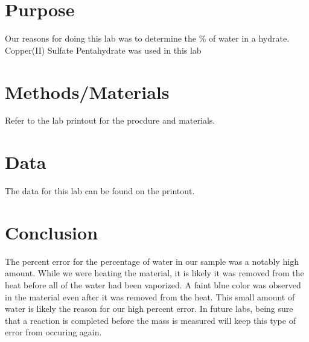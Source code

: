 \documentclass{article}
\begin{document}

\section{Purpose}
	Our reasons for doing this lab was to determine the \% of water in a hydrate. Copper(II) Sulfate Pentahydrate was used in this lab
\section{Methods/Materials}
	Refer to the lab printout for the procdure and materials.
\section{Data}
	The data for this lab can be found on the printout.
\section{Conclusion}
	The percent error for the percentage of water in our sample was a notably high amount. While we were heating the material, it is likely it was removed from the heat before all of the water had been vaporized. A faint blue color was observed in the material even after it was removed from the heat. This small amount of water is likely the reason for our high percent error. In future labs, being sure that a reaction is completed before the mass is measured will keep this type of error from occuring again.
\end{document}
